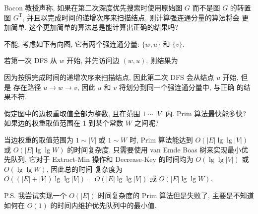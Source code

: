 \documentclass[boxes]{homework}
\begin{document}
\begin{problem}
Bacon 教授声称, 如果在第二次深度优先搜索时使用原始图 $G$ 而不是图 $G$ 的转置图
$G^{\mathrm{T}}$, 并且以完成时间的递增次序来扫描结点, 则计算强连通分量的算法将会
更加简单. 这个更加简单的算法总是能计算出正确的结果吗?
\end{problem}
\begin{solution}
    不能, 考虑如下有向图, 它有两个强连通分量: $\{w, u\}$ 和 $\{v\}$.
    \begin{center}
    \end{center}
    若第一次 DFS 从 $w$ 开始, 并先访问边 $(w, u)$, 则结果为
    \begin{center}
    \end{center}
    因为按照完成时间的递增次序来扫描结点, 因此第二次 DFS 会从结点 $u$ 开始, 但是
    存在路径 $u \to w \to v$, 因此 $u$ 和 $v$ 将划分到同一个强连通分量中, 与正确
    的结果不符.
\end{solution}

\begin{problem}
假定图中的边权重取值全部为整数, 且在范围 $1 \sim |V|$ 内. Prim 算法最快能多快?
如果边的权重取值范围在 1 到某个常数 $W$ 之间呢?
\end{problem}
\begin{solution}
    当边权重的取值范围为 $1 \sim |V|$ 或 $1 \sim W$ 时, Prim 算法能达到
    $O(|E|\lg\lg |V|)$ 或 $O(|E|\lg\lg W)$ 的时间复杂度. 只需要使用 van Emde
    Boas 树来实现最小优先队列, 它对于 {\sc Extract-Min} 操作和
    {\sc Decrease-Key} 的时间均为 $O(\lg\lg |V|)$ 或 $O(\lg\lg W)$, 因此总的时间
    复杂度为 $O((|E| + |V|)\lg\lg |V|) = O(|E|\lg\lg |V|)$ 或 $O(|E|\lg\lg W)$.

    P.S. 我尝试实现一个 $O(|E|)$ 时间复杂度的 Prim 算法但是失败了, 主要是不知道
    如何在 $O(1)$ 的时间内维护优先队列中的最小值.
\end{solution}
\end{document}
